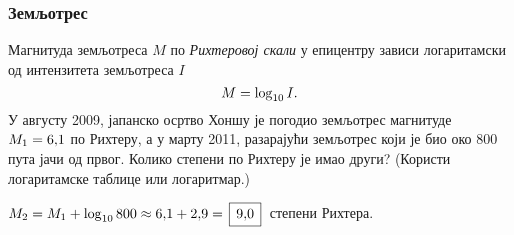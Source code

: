 \subsubsection{Земљотрес}

\zadatak Магнитуда земљотреса $M$ по {\sl Рихтеровој скали\/} у епицентру зависи логаритамски од 
интензитета земљотреса $I$
$$
M=\log_{10} I.
$$
У августу 2009, јапанско осртво Хоншу
је погодио земљотрес магнитуде $M_1=6\.1$ по Рихтеру, а у марту 2011,
разарајући земљотрес који је био око 800 пута јачи од првог.
Колико степени по Рихтеру је имао други?
(Користи логаритамске таблице или логаритмар.)

\resenje $M_2 = M_1 + \logten 800 \approx 6\.1 + 2\.9 = \ram{9\.0}$ степени Рихтера. 
